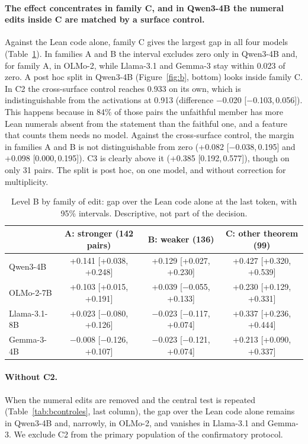\documentclass[10pt]{article}
\newcommand{\ic}[2]{[#1,\,#2]}
\begin{document}
\paragraph{The effect concentrates in family C, and in Qwen3-4B the numeral edits inside C are matched by a surface control.}
Against the Lean code alone, family C gives the largest gap in all four models (Table~\ref{tab:bfam}). In families A and
B the interval excludes zero only in Qwen3-4B and, for family A, in OLMo-2, while Llama-3.1 and Gemma-3 stay within
0.023 of zero. A post hoc split in Qwen3-4B (Figure~\ref{fig:b}, bottom) looks inside family C. In C2 the cross-surface
control reaches 0.933 on its own, which is indistinguishable from the activations at 0.913 (difference −0.020
\ic{−0.103}{0.056}). This happens because in 84\% of those pairs the unfaithful member has more Lean numerals
absent from the statement than the faithful one, and a feature that counts them needs no model. Against
the cross-surface control, the margin in families A and B is not distinguishable from zero (+0.082 \ic{−0.038}{0.195} and +0.098
\ic{0.000}{0.195}). C3 is clearly above it (+0.385 \ic{0.192}{0.577}), though on only 31 pairs. The split is
post hoc, on one model, and without correction for multiplicity.


\begin{table}[h]
\centering
\caption{Level B by family of edit: gap over the Lean code alone at the last token, with 95\% intervals. Descriptive, not part of the decision.}
\label{tab:bfam}
\vspace{2pt}
{\small
\begin{tabular}{@{}lccc@{}}
\toprule
 & A: stronger (142 pairs) & B: weaker (136) & C: other theorem (99)\\
\midrule
Qwen3-4B     & +0.141 [+0.038, +0.248] & +0.129 [+0.027, +0.230] & +0.427 [+0.320, +0.539]\\
OLMo-2-7B    & +0.103 [+0.015, +0.191] & +0.039 [−0.055, +0.133] & +0.230 [+0.129, +0.331]\\
Llama-3.1-8B & +0.023 [−0.080, +0.126] & −0.023 [−0.117, +0.074] & +0.337 [+0.236, +0.444]\\
Gemma-3-4B   & −0.008 [−0.126, +0.107] & −0.023 [−0.121, +0.074] & +0.213 [+0.090, +0.337]\\
\bottomrule
\end{tabular}}
\end{table}

\paragraph{Without C2.}
When the numeral edits are removed and the central test is repeated (Table~\ref{tab:bcontroles}, last column), the
gap over the Lean code alone remains in Qwen3-4B and, narrowly, in OLMo-2, and vanishes in Llama-3.1 and Gemma-3. We exclude C2
from the primary population of the confirmatory protocol.
\end{document}
